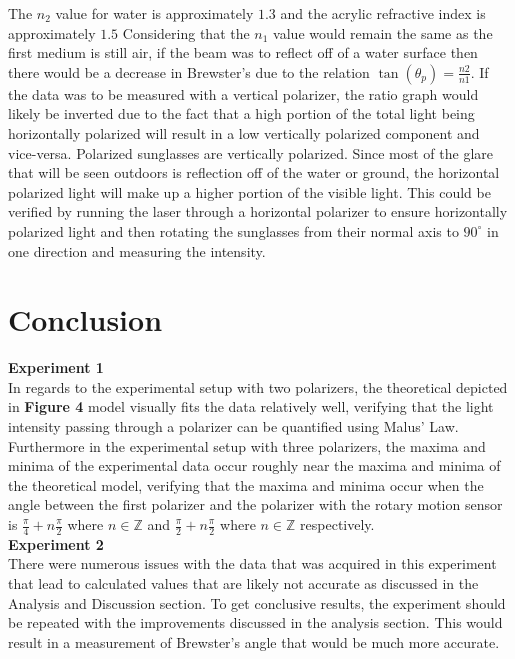 \documentclass[
	letterpaper, %
	10pt, %
]{CSUniSchoolLabReport}
\begin{document}
The $n_2$ value for water is approximately $1.3$ and the acrylic refractive index is approximately $1.5$ Considering that the
$n_1$ value would remain the same as the first medium is still air, if the beam was to reflect off of a
water surface then there would be a decrease in Brewster's due to the relation $\tan(\theta_p) = \frac{n2}{n1}$. If the
data was to be measured with a vertical polarizer, the ratio graph would likely be inverted due to the fact that a high portion
of the total light being horizontally polarized will result in a low vertically polarized component and vice-versa. Polarized sunglasses
are vertically polarized. Since most of the glare that will be seen outdoors is reflection off of the water or ground, the
horizontal polarized light will make up a higher portion of the visible light. This could be verified by running the laser through
a horizontal polarizer to ensure horizontally polarized light and then rotating the sunglasses from their normal axis to $90^\circ$
in one direction and measuring the intensity.

\section{Conclusion}
\textbf{Experiment 1}\\
In regards to the experimental setup with two polarizers, the theoretical depicted in \textbf{Figure 4} model visually fits the data relatively well,
verifying that the light intensity passing through a polarizer can be quantified using Malus' Law. Furthermore in the
experimental setup with three polarizers, the maxima and minima of the experimental data occur roughly near the maxima
and minima of the theoretical model, verifying that the maxima and minima occur when the angle between the first polarizer
and the polarizer with the rotary motion sensor is $\frac{\pi}{4} + n\frac{\pi}{2}$ where $n \in \mathbb{Z}$ and
$\frac{\pi}{2}+n\frac{\pi}{2}$ where $n\in \mathbb{Z}$ respectively.\\

\textbf{Experiment 2}\\
There were numerous issues with the data that was acquired in this experiment that lead to calculated values that are
likely not accurate as discussed in the Analysis and Discussion section. To get conclusive results, the experiment should be
repeated with the improvements discussed in the analysis section. This would result in a measurement
of Brewster's angle that would be much more accurate.
\newpage
\end{document}
